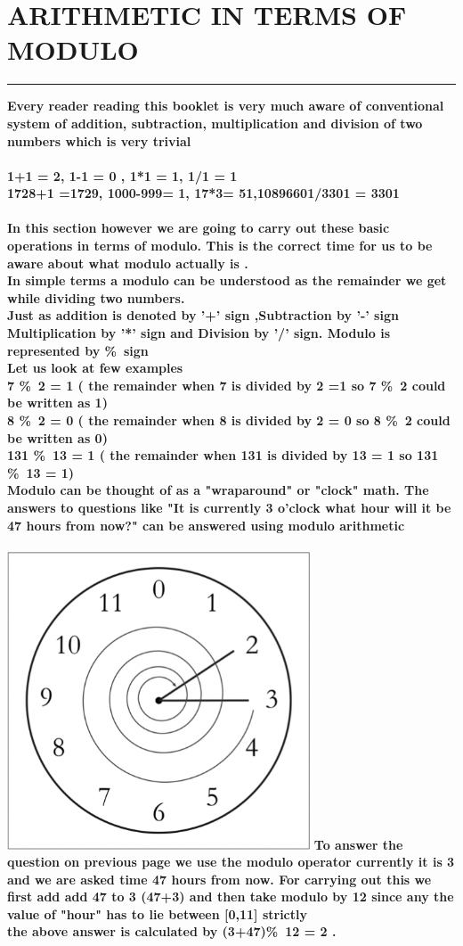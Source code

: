 \documentclass{article}
\begin{document}
\section * {ARITHMETIC IN TERMS OF MODULO }
\hrule
\bigskip
\textbf{Every reader reading this booklet is very much aware of conventional system of addition, subtraction, multiplication and division of two numbers which is very trivial
\\
\\1+1 = 2, 1-1 = 0 , 1*1 = 1,  1/1 = 1
\\1728+1 =1729, 1000-999= 1, 17*3= 51,10896601/3301 = 3301
}
\\ 
\\
\textbf{In this section however we are going to carry out these basic operations in terms of modulo. This is the correct time for us to be aware about what modulo actually is .
\\In simple terms a modulo can be understood as  the remainder we get while dividing two numbers. 
\\
Just as  addition is denoted  by '+' sign ,Subtraction by '-' sign Multiplication by '*' sign and Division by '/' sign. Modulo is represented by \%\ sign
\\ Let us look at few examples 
\\ 7 \%\ 2 = 1 ( the remainder when 7 is divided by 2 =1 so 7 \%\ 2 could be written as 1)
\\ 8 \%\ 2 = 0 ( the remainder when 8 is divided by 2 = 0 so 8 \%\ 2 could be written as 0)
\\ 131 \%\ 13 = 1 ( the remainder when 131 is divided by 13 = 1 so 131 \%\ 13 = 1)
\\
Modulo can be thought of as a "wraparound" or "clock" math. The answers to questions like "It is currently 3 o'clock what hour will it be 47 hours from now?" can be answered using modulo arithmetic}
\\
\\

\includegraphics[scale = 0.25,width =9cm]{images/clock.png}
\textbf{To answer the question on previous page we use the modulo operator 
currently it is 3 and we are asked time 47 hours from now. For carrying out this we first add add 47 to 3 (47+3) and then take modulo by 12 since any the value of "hour" has to lie between [0,11] strictly \\
the above  answer  is calculated by (3+47)\%\ 12 = 2 . }
\end{document}
